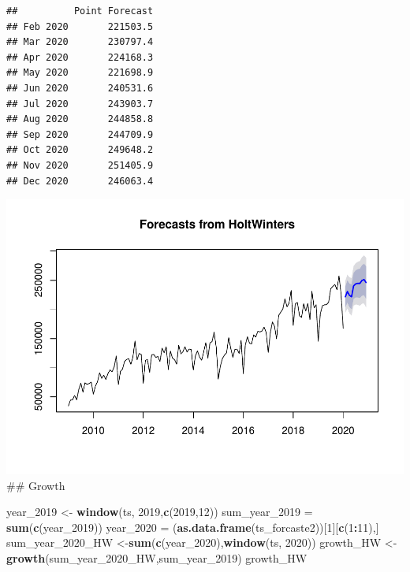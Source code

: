 \documentclass[
]{article}
\newenvironment{Shaded}{\begin{snugshade}}{\end{snugshade}}
\newcommand{\DecValTok}[1]{\textcolor[rgb]{0.00,0.00,0.81}{#1}}
\newcommand{\KeywordTok}[1]{\textcolor[rgb]{0.13,0.29,0.53}{\textbf{#1}}}
\newcommand{\NormalTok}[1]{#1}
\newcommand{\OperatorTok}[1]{\textcolor[rgb]{0.81,0.36,0.00}{\textbf{#1}}}
\newcommand{\StringTok}[1]{\textcolor[rgb]{0.31,0.60,0.02}{#1}}
\begin{document}
\begin{verbatim}
##          Point Forecast
## Feb 2020       221503.5
## Mar 2020       230797.4
## Apr 2020       224168.3
## May 2020       221698.9
## Jun 2020       240531.6
## Jul 2020       243903.7
## Aug 2020       244858.8
## Sep 2020       244709.9
## Oct 2020       249648.2
## Nov 2020       251405.9
## Dec 2020       246063.4
\end{verbatim}

\includegraphics{tsf_export_files/figure-latex/unnamed-chunk-15-1.pdf}
\#\# Growth

\begin{Shaded}
\begin{Highlighting}[]
\NormalTok{year_}\DecValTok{2019}\NormalTok{ <-}\StringTok{ }\KeywordTok{window}\NormalTok{(ts, }\DecValTok{2019}\NormalTok{,}\KeywordTok{c}\NormalTok{(}\DecValTok{2019}\NormalTok{,}\DecValTok{12}\NormalTok{))}
\NormalTok{sum_year_}\DecValTok{2019}\NormalTok{ =}\StringTok{ }\KeywordTok{sum}\NormalTok{(}\KeywordTok{c}\NormalTok{(year_}\DecValTok{2019}\NormalTok{))}
\NormalTok{year_}\DecValTok{2020}\NormalTok{ =}\StringTok{ }\NormalTok{(}\KeywordTok{as.data.frame}\NormalTok{(ts_forcaste2))[}\DecValTok{1}\NormalTok{][}\KeywordTok{c}\NormalTok{(}\DecValTok{1}\OperatorTok{:}\DecValTok{11}\NormalTok{),]}
\NormalTok{sum_year_}\DecValTok{2020}\NormalTok{_HW <-}\KeywordTok{sum}\NormalTok{(}\KeywordTok{c}\NormalTok{(year_}\DecValTok{2020}\NormalTok{),}\KeywordTok{window}\NormalTok{(ts, }\DecValTok{2020}\NormalTok{))}
\NormalTok{growth_HW <-}\StringTok{ }\KeywordTok{growth}\NormalTok{(sum_year_}\DecValTok{2020}\NormalTok{_HW,sum_year_}\DecValTok{2019}\NormalTok{)}
\NormalTok{growth_HW}
\end{Highlighting}
\end{Shaded}
\end{document}
